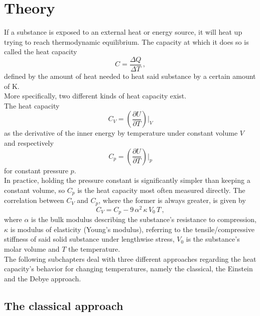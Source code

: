 \section{Theory}
\label{sec:theorie}

If a substance is exposed to an external heat or energy source,
it will heat up trying to reach thermodynamic equilibrium.
The capacity at which it does so is called the heat capacity
\begin{equation*}
    C = \frac{\Delta Q}{\Delta T} \,,
\end{equation*}
defined by the amount of heat needed to heat said substance by a certain amount of
$\si{\kelvin}$. \\

More specifically, two different kinds of heat capacity exist. \\
The heat capacity 
\begin{equation*}
    C_{V} = \left( \frac{\partial U}{\partial T} \right) \big \vert _V
\end{equation*}
as the derivative of the inner energy by temperature under constant volume $V$ and respectively
\begin{equation*}
    C_{p} = \left( \frac{\partial U}{\partial T} \right) \big \vert _p
\end{equation*}
for constant pressure $p$. \\

In practice, holding the pressure constant is significantly simpler than keeping a constant volume, so $C_p$ is the heat capacity most often measured directly.
The correlation between $C_V$ and $C_p$, where the former is always greater, is given by
\begin{equation}
    C_V = C_p - 9 \, \alpha^2 \, \kappa \, V_0 \, T \,,
\end{equation}
where $\alpha$ is the bulk modulus describing the substance's resistance to compression, $\kappa$ is modulus of elasticity (Young's modulus), referring to the tensile/compressive stiffness of said solid substance
under lengthwise stress, $V_0$ is the substance's molar volume and $T$ the temperature. \\

The following subchapters deal with three different approaches regarding the heat capacity's behavior for changing temperatures, namely the classical, the Einstein and the Debye approach.

\subsection{The classical approach}

